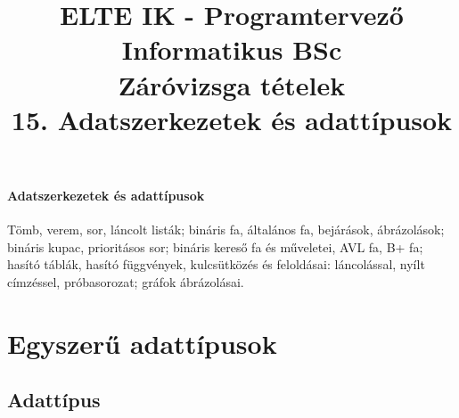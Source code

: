 \documentclass[margin=0px]{article}
\title{\textbf{{\Large ELTE IK - Programtervező Informatikus BSc} \vspace{0.2cm} \\ {\huge Záróvizsga tételek}} \vspace{0.3cm} \\ 15. Adatszerkezetek és adattípusok}
\author{}
\date{}
\newenvironment{tetel}[1]{\paragraph{#1 \\}}{}
\begin{document}
\maketitle

\begin{tetel}{Adatszerkezetek és adattípusok}
    Tömb, verem, sor, láncolt listák; bináris fa, általános fa, bejárások, ábrázolások; bináris
kupac, prioritásos sor; bináris kereső fa és műveletei, AVL fa, B+ fa; hasító táblák, hasító
függvények, kulcsütközés és feloldásai: láncolással, nyílt címzéssel, próbasorozat; gráfok
ábrázolásai.
\end{tetel}

\section{Egyszerű adattípusok}

\subsection{Adattípus}
\end{document}
